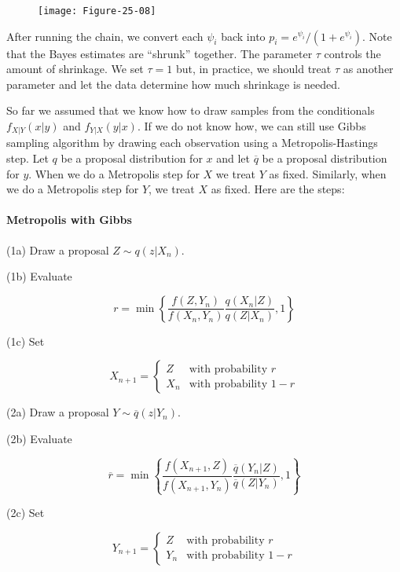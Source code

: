 \begin{figure}[H]
\centering
\texttt{[image: Figure-25-08]}
\end{figure}

After running the chain, we convert each \(\psi_{i}\) back into
\(p_{i} = e^{\psi_{i}} / (1 + e^{\psi_{i}})\). Note that the Bayes estimates
are ``shrunk'' together. The parameter \(\tau\) controls the amount of
shrinkage. We set \(\tau = 1\) but, in practice, we should treat
\(\tau\) as another parameter and let the data determine how much
shrinkage is needed.

So far we assumed that we know how to draw samples from the conditionals
\(f_{X | Y}(x | y)\) and \(f_{Y | X}(y | x)\). If we do not know how, we
can still use Gibbs sampling algorithm by drawing each observation using
a Metropolis-Hastings step. Let \(q\) be a proposal distribution for
\(x\) and let \(\overline{q}\) be a proposal distribution for \(y\).
When we do a Metropolis step for \(X\) we treat \(Y\) as fixed.
Similarly, when we do a Metropolis step for \(Y\), we treat \(X\) as
fixed. Here are the steps:

\paragraph{Metropolis with Gibbs}\label{metropolis-with-gibbs}

(1a) Draw a proposal \(Z \sim q(z | X_{n})\).

(1b) Evaluate

\[ r = \min \left\{ \frac{f(Z, Y_{n})}{f(X_{n}, Y_{n})} \frac{q(X_{n} | Z)}{q(Z | X_{n})}, 1\right\} \]

(1c) Set

\[ X_{n+1} = \begin{cases}
Z &\text{with probability } r \\
X_{n} &\text{with probability } 1 - r
\end{cases} \]

(2a) Draw a proposal \(Y \sim \overline{q}(z | Y_{n})\).

(2b) Evaluate

\[ \overline{r} = \min \left\{ \frac{f(X_{n+1}, Z)}{f(X_{n+1}, Y_{n})} \frac{\overline{q}(Y_{n} | Z)}{\overline{q}(Z | Y_{n})}, 1 \right\} \]

(2c) Set

\[ Y_{n+1} = \begin{cases}
Z &\text{with probability } r \\
Y_{n} &\text{with probability } 1 - r
\end{cases}
\]

